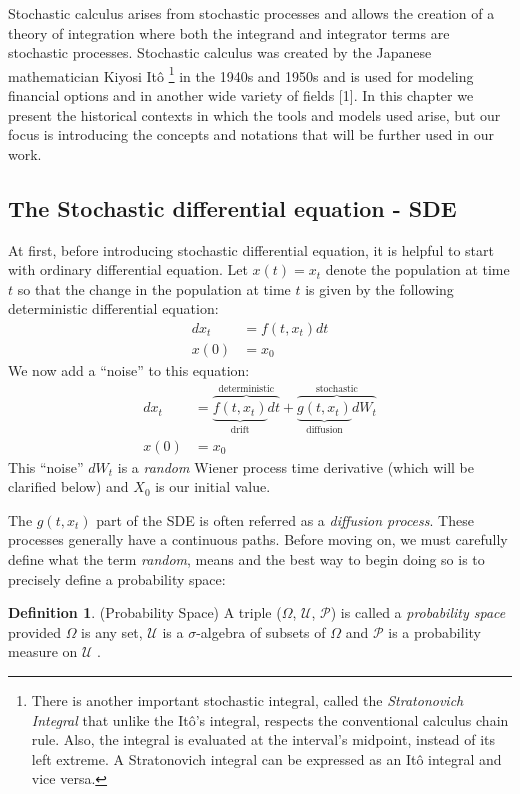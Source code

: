 \documentclass[12pt,twoside]{reedthesis}
\theoremstyle{definition}
\newtheorem{definition}{Definition}[section]
\theoremstyle{definition}
\theoremstyle{remark}
\begin{document}
  Stochastic calculus arises from stochastic processes and allows the
  creation of a theory of integration where both the integrand and
  integrator terms are stochastic processes. Stochastic calculus was
  created by the Japanese mathematician Kiyosi Itô
  \footnote{There is another important stochastic integral, called the \textit{Stratonovich Integral} that unlike the Itô's integral, respects the conventional calculus chain rule. Also, the integral is evaluated at the interval's midpoint, instead of its left extreme. A Stratonovich integral can be expressed as an Itô integral and vice versa.}
  in the 1940s and 1950s and is used for modeling financial options and in
  another wide variety of fields {[}1{]}. In this chapter we present the
  historical contexts in which the tools and models used arise, but our
  focus is introducing the concepts and notations that will be further
  used in our work.
  
  \subsection{The Stochastic differential equation -
  SDE}\label{the-stochastic-differential-equation---sde}
  
  At first, before introducing stochastic differential equation, it is
  helpful to start with ordinary differential equation. Let \(x(t) = x_t\)
  denote the population at time \(t\) so that the change in the population
  at time \(t\) is given by the following deterministic differential
  equation:
  \begin{align}
  dx_t &= f(t, x_t)dt \\
  x(0) &= x_0 \nonumber
  \end{align}
  We now add a ``noise'' to this equation:
  \begin{align} \label{sde1}
  dx_t &= \overbrace{\underbrace{f(t, x_t)}_\text{drift}dt}^\text{deterministic} + \overbrace{\underbrace{g(t, x_t)}_\text{diffusion}dW_t}^\text{stochastic} \\
  x(0) &= x_0 \nonumber
  \end{align}
  This ``noise'' \(dW_t\) is a \emph{random} Wiener process time
  derivative (which will be clarified below) and \(X_0\) is our initial
  value.
  
  The \(g(t, x_t)\) part of the SDE is often referred as a \emph{diffusion
  process}. These processes generally have a continuous paths. Before
  moving on, we must carefully define what the term \emph{random}, means
  and the best way to begin doing so is to precisely define a probability
  space:
  \begin{definition}{(Probability Space)} A triple ($\Omega$, $\mathcal {U}$, $\mathcal {P}$) is called a \textit{probability space} provided $\Omega$ is any set, $\mathcal {U}$ is a $\sigma$-algebra of subsets of $\Omega$ and $\mathcal {P}$ is a probability measure on $\mathcal {U}$ .
  \end{definition}
\end{document}
